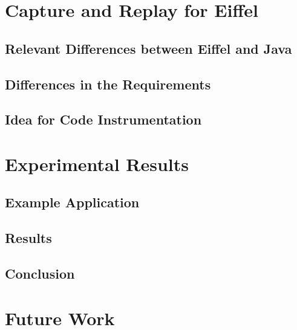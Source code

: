 \documentclass[a4paper,10pt]{report}
\begin{document}
\addtolength{\parskip}{-0.5\baselineskip} %
\tableofcontents

\newpage

\addtolength{\parskip}{0.5\baselineskip} %




\chapter{Capture and Replay for Eiffel}
\section{Relevant Differences between Eiffel and Java}
\section{Differences in the Requirements}
\section{Idea for Code Instrumentation}



\chapter{Experimental Results}
\section{Example Application}
\section{Results}
\section{Conclusion}

\chapter{Future Work}
\end{document}
